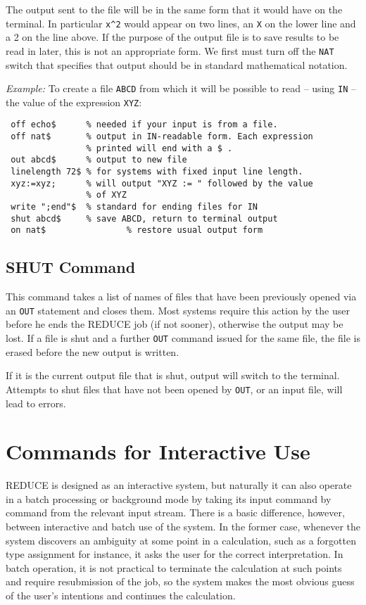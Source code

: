 \documentclass[11pt,letterpaper]{book}
\makeatletter
\newcommand{\REDUCE}{REDUCE}
\newcommand{\underscore}{\_}
\newcommand{\ttindex}[1]{{\renewcommand{\_}{\protect\underscore}%
                          \index{#1@{\tt #1}}}}
\makeatother
\begin{document}
The output sent to the file will be in the same form that it would have on
the terminal.  In particular {\tt x\verb|^|2} would appear on two lines, an
{\tt X} on the lower line and a 2 on the line above.  If the purpose of the
output file is to save results to be read in later, this is not an
appropriate form.  We first must turn off the {\tt NAT} switch that
specifies that output should be in standard mathematical notation.

{\it Example:} To create a file {\tt ABCD} from which it will be possible
to read -- using {\tt IN} -- the value of the expression {\tt XYZ}:
{\small\begin{verbatim}
 off echo$      % needed if your input is from a file.
 off nat$       % output in IN-readable form. Each expression
                % printed will end with a $ .
 out abcd$      % output to new file
 linelength 72$ % for systems with fixed input line length.
 xyz:=xyz;      % will output "XYZ := " followed by the value
                % of XYZ
 write ";end"$  % standard for ending files for IN
 shut abcd$     % save ABCD, return to terminal output
 on nat$                % restore usual output form
\end{verbatim}}

\section{SHUT Command}\ttindex{SHUT}
This command takes a list of names of files that have been previously
opened via an {\tt OUT} statement and closes them. Most systems require this
action by the user before he ends the {\REDUCE} job (if not sooner),
otherwise the output may be lost. If a file is shut and a further {\tt OUT}
command issued for the same file, the file is erased before the new output
is written.

If it is the current output file that is shut, output will switch to the
terminal.  Attempts to shut files that have not been opened by {\tt OUT},
or an input file, will lead to errors.

\chapter{Commands for Interactive Use}

{\REDUCE} is designed as an interactive system, but naturally it can also
operate in a batch processing or background mode by taking its input
command by command from the relevant input stream. There is a basic
difference, however, between interactive and batch use of the system. In
the former case, whenever the system discovers an ambiguity at some point
in a calculation, such as a forgotten type assignment for instance, it asks
the user for the correct interpretation. In batch operation, it is not
practical to terminate the calculation at such points and require
resubmission of the job, so the system makes the most obvious guess of the
user's intentions and continues the calculation.
\end{document}
